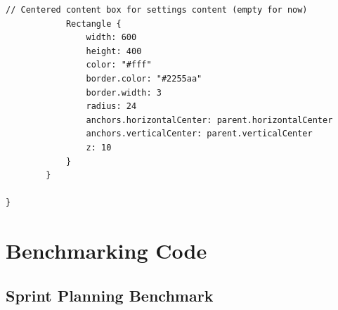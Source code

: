 \documentclass{report}
\begin{document}
\begin{lstlisting}[style=qmlstyle]
            // Centered content box for settings content (empty for now)
            Rectangle {
                width: 600
                height: 400
                color: "#fff"
                border.color: "#2255aa"
                border.width: 3
                radius: 24
                anchors.horizontalCenter: parent.horizontalCenter
                anchors.verticalCenter: parent.verticalCenter
                z: 10
            }
        }

}

\end{lstlisting}
\section{Benchmarking Code}
\subsection{Sprint Planning Benchmark}
\end{document}
